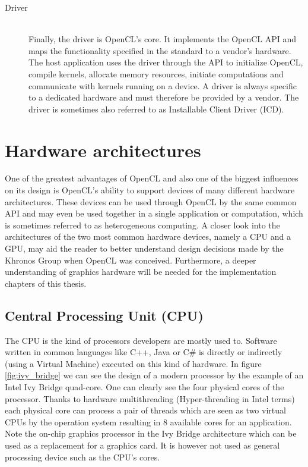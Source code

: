\begin{description}
	\item[Driver] \hfill \\
	Finally, the driver is OpenCL's core. It implements the OpenCL API and maps the functionality specified in the standard to a vendor's hardware. The host application uses the driver through the API to initialize OpenCL, compile kernels, allocate memory resources, initiate computations and communicate with kernels running on a device. A driver is always specific to a dedicated hardware and must therefore be provided by a vendor. The driver is sometimes also referred to as Installable Client Driver (ICD).
\end{description}

\section{Hardware architectures}
\label{sec:hardware_arch}

One of the greatest advantages of OpenCL and also one of the biggest influences on its design is OpenCL's ability to support devices of many different hardware architectures. These devices can be used through OpenCL by the same common API and may even be used together in a single application or computation, which is sometimes referred to as heterogeneous computing.
A closer look into the architectures of the two most common hardware devices, namely a CPU and a GPU, may aid the reader to better understand design decisions made by the Khronos Group when OpenCL was conceived. Furthermore, a deeper understanding of graphics hardware will be needed for the implementation chapters of this thesis.

\subsection{Central Processing Unit (CPU)}

The CPU is the kind of processors developers are mostly used to. Software written in common languages like C++, Java or C\# is directly or indirectly (using a Virtual Machine) executed on this kind of hardware.
In figure \ref{fig:ivy_bridge} we can see the design of a modern processor by the example of an Intel Ivy Bridge quad-core. One can clearly see the four physical cores of the processor. Thanks to hardware multithreading (Hyper-threading in Intel terms) each physical core can process a pair of threads which are seen as two virtual CPUs by the operation system resulting in 8 available cores for an application.
Note the on-chip graphics processor in the Ivy Bridge architecture which can be used as a replacement for a graphics card. It is however not used as general processing device such as the CPU's cores.

